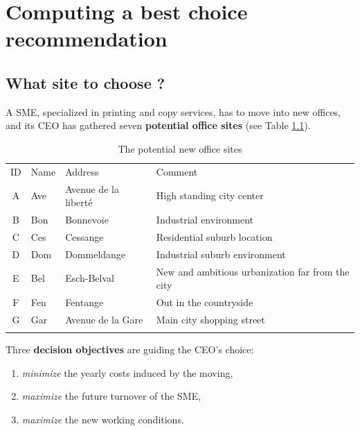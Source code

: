 \chapter{Computing a best choice recommendation}
\label{sec:6}




\section{What site to choose ?}
\label{sec:6.1}

A SME, specialized in printing and copy services, has to move into new offices, and its CEO has gathered seven \textbf{potential office sites} (see Table \ref{tab:6.1}).

\begin{table}[h]
\caption{The potential new office sites}
\label{tab:6.1}       %
\begin{center}
    \begin{tabular}{c|l|l|l}
      \hline\noalign{\smallskip}
      ID & Name & Address & Comment\\
      \noalign{\smallskip}\hline\noalign{\smallskip}
    A &   Ave  &  Avenue de la liberté &  High standing city center\\
    B &   Bon  &  Bonnevoie &             Industrial environment\\
    C &   Ces  &  Cessange &              Residential suburb location\\
    D &   Dom  &  Dommeldange &           Industrial suburb environment\\
    E &   Bel  &  Esch-Belval &           New and ambitious urbanization far from the city\\
    F &   Fen  &  Fentange &              Out in the countryside\\
      G &   Gar  &  Avenue de la Gare &     Main city shopping street\\
      \noalign{\smallskip}\hline
    \end{tabular}
\end{center}
\end{table}

Three \textbf{decision objectives} are guiding the CEO's choice:
\begin{enumerate}
\item \emph{minimize} the yearly costs induced by the moving,
\item \emph{maximize} the future turnover of the SME,
\item \emph{maximize} the new working conditions.
\end{enumerate}

